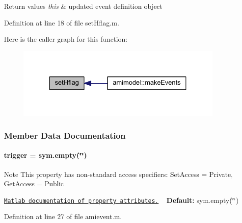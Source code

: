 \begin{DoxyRetVals}{Return values}
{\em this} & updated event definition object \\
\hline
\end{DoxyRetVals}


Definition at line 18 of file set\+Hflag.\+m.



Here is the caller graph for this function\+:\nopagebreak
\begin{figure}[H]
\begin{center}
\leavevmode
\includegraphics[width=289pt]{classamievent_aef1933f186f69e58e2aa1b00d01f75e7_icgraph}
\end{center}
\end{figure}




\subsubsection{Member Data Documentation}
\hypertarget{classamievent_ae194cb817eae4085f8023885100c68dd}{}
\paragraph[{trigger}]{\setlength{\rightskip}{0pt plus 5cm}trigger = sym.\+empty(\char`\"{}\char`\"{})}\label{classamievent_ae194cb817eae4085f8023885100c68dd}
\begin{DoxyNote}{Note}
This property has non-\/standard access specifiers\+: {\ttfamily Set\+Access = Private, Get\+Access = Public} 

\href{http://www.mathworks.com/help/matlab/matlab_oop/property-attributes.html}{\tt Matlab documentation of property attributes.} ~\newline
{\bfseries Default\+:} sym.\+empty(\char`\"{}\char`\"{}) 
\end{DoxyNote}


Definition at line 27 of file amievent.\+m.

\hypertarget{classamievent_ab9227561ac246ee4b70f9e65c25ffda7}{}
